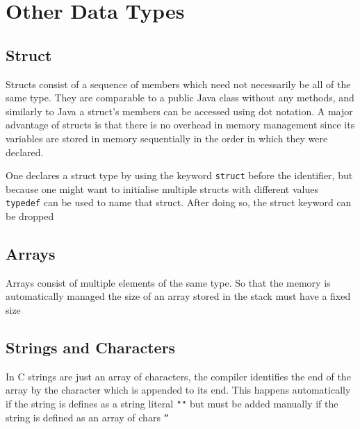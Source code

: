 \section{Other Data Types}

\subsection{Struct}
\par{Structs consist of a sequence of members which need not necessarily be all of the same
type. They are comparable to a public Java class without any methods, and similarly to Java a
struct's members can be accessed using dot notation. A major advantage of structs is that there is
no overhead in memory management since its variables are stored in memory sequentially in the order
in which they were declared.}
\par{One declares a struct type by using the keyword \texttt{struct} before the identifier, but
because one might want to initialise multiple structs with different values \texttt{typedef} can be
used to name that struct. After doing so, the struct keyword can be dropped}

\subsection{Arrays}
\par{Arrays consist of multiple elements of the same type. So that the memory is automatically
managed the size of an array stored in the stack  must have a fixed size }



\subsection{Strings and Characters}

\par{In C strings are just an array of characters, the compiler identifies the end of the array
by the \texttt{\0} character which is appended to its end. This happens automatically if the string
is defines as a string literal \texttt{""} but must be added manually if the string is defined as an
array of chars \texttt{''}}

